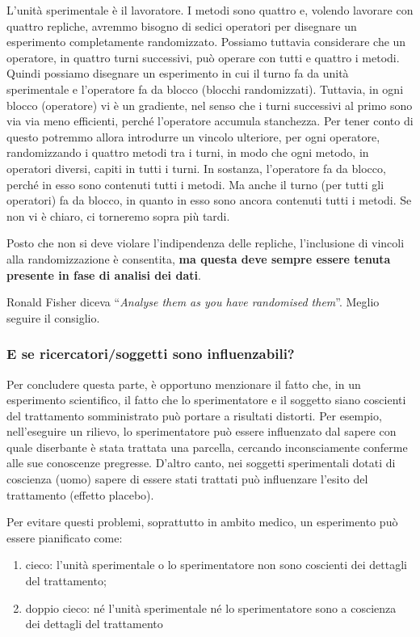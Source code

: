 \documentclass[a4paper,12pt,oneside]{book}
\providecommand{\tightlist}{%
  \setlength{\itemsep}{0pt}\setlength{\parskip}{0pt}}
\begin{document}
L'unità sperimentale è il lavoratore. I metodi sono quattro e, volendo
lavorare con quattro repliche, avremmo bisogno di sedici operatori per
disegnare un esperimento completamente randomizzato. Possiamo tuttavia
considerare che un operatore, in quattro turni successivi, può operare
con tutti e quattro i metodi. Quindi possiamo disegnare un esperimento
in cui il turno fa da unità sperimentale e l'operatore fa da blocco
(blocchi randomizzati). Tuttavia, in ogni blocco (operatore) vi è un
gradiente, nel senso che i turni successivi al primo sono via via meno
efficienti, perché l'operatore accumula stanchezza. Per tener conto di
questo potremmo allora introdurre un vincolo ulteriore, per ogni
operatore, randomizzando i quattro metodi tra i turni, in modo che ogni
metodo, in operatori diversi, capiti in tutti i turni. In sostanza,
l'operatore fa da blocco, perché in esso sono contenuti tutti i metodi.
Ma anche il turno (per tutti gli operatori) fa da blocco, in quanto in
esso sono ancora contenuti tutti i metodi. Se non vi è chiaro, ci
torneremo sopra più tardi.

Posto che non si deve violare l'indipendenza delle repliche,
l'inclusione di vincoli alla randomizzazione è consentita, \textbf{ma
questa deve sempre essere tenuta presente in fase di analisi dei dati}.

Ronald Fisher diceva ``\emph{Analyse them as you have randomised
them}''. Meglio seguire il consiglio.

\subsubsection{E se ricercatori/soggetti sono
influenzabili?}\label{e-se-ricercatorisoggetti-sono-influenzabili}

Per concludere questa parte, è opportuno menzionare il fatto che, in un
esperimento scientifico, il fatto che lo sperimentatore e il soggetto
siano coscienti del trattamento somministrato può portare a risultati
distorti. Per esempio, nell'eseguire un rilievo, lo sperimentatore può
essere influenzato dal sapere con quale diserbante è stata trattata una
parcella, cercando inconsciamente conferme alle sue conoscenze
pregresse. D'altro canto, nei soggetti sperimentali dotati di coscienza
(uomo) sapere di essere stati trattati può influenzare l'esito del
trattamento (effetto placebo).

Per evitare questi problemi, soprattutto in ambito medico, un
esperimento può essere pianificato come:

\begin{enumerate}
\def\labelenumi{\arabic{enumi}.}
\tightlist
\item
  cieco: l'unità sperimentale o lo sperimentatore non sono coscienti dei
  dettagli del trattamento;
\item
  doppio cieco: né l'unità sperimentale né lo sperimentatore sono a
  coscienza dei dettagli del trattamento
\end{enumerate}
\end{document}
